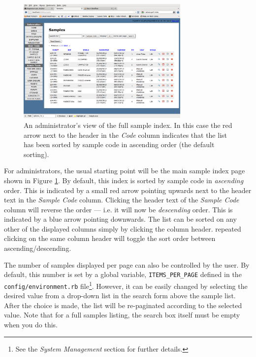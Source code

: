 \documentclass[12pt,twoside]{article}
\begin{document}
\begin{figure}[!h]
\begin{center}
\includegraphics[width=0.75\textwidth]{sampleindex}
\caption{An administrator's view of the full sample index. 
In this case the red arrow next to the header in the \emph{Code}
column indicates that the list has been sorted by sample code in
ascending order (the default sorting).\label{fig:sampleindex}}
\end{center}
\end{figure}

For administrators, the usual starting point will be the main sample
index page shown in Figure \ref{fig:sampleindex}.
By default, this index is sorted by sample code in \emph{ascending} order.
This is indicated by a small red arrow pointing upwards next to the header
text in the \emph{Sample Code} column. 
Clicking the header text of the \emph{Sample Code} column will reverse the
order --- i.e. it will now be \emph{descending} order. This is indicated
by a blue arrow pointing downwards.
The list can be sorted on any other of the displayed columns simply by
clicking the column header. repeated clicking on the same column header
will toggle the sort order between ascending/descending.

The number of samples displayed per page can also be controlled by the
user. By default, this number is set by a global variable,
\verb=ITEMS_PER_PAGE= defined in the \verb=config/environment.rb= file\footnote{See the \emph{System Management} section for further details.}.
However, it can be easily changed by selecting the desired value from
a drop-down list in the search form above the sample list.
After the choice is made, the list will be re-paginated according to
the selected value. Note that for a full samples listing, the search box
itself must be empty when you do this.
\end{document}
